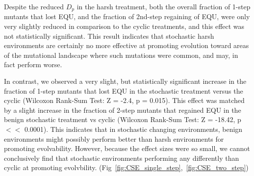\documentclass[PhD]{msu-thesis}
\begin{document}
Despite the reduced $D_p$ in the harsh treatment, both the overall fraction of 1-step mutants that lost EQU, and the fraction of 2nd-step regaining of EQU, were only very slightly reduced in comparison to the cyclic treatments, and this effect was not statistically significant. This result indicates that stochastic harsh environments are certainly no more effective at promoting evolution toward areas of the mutational landscape where such mutations were common, and may, in fact perform worse. 

In contrast, we observed a very slight, but statistically significant increase in the fraction of 1-step mutants that lost EQU in the stochastic treatment versus the cyclic (Wilcoxon Rank-Sum Test: Z = -2.4, p = 0.015). This effect was matched by a slight increase in the fraction of 2-step mutants that regained EQU in the benign stochastic treatment vs cyclic (Wilcoxon Rank-Sum Test: Z = -18.42, p $<<$ 0.0001). This indicates that in stochastic changing environments, benign environments might possibly perform better than harsh environments for promoting evolvability. However, because the effect sizes were so small, we cannot conclusively find that stochastic environments performing any differently than cyclic at promoting evolvbility.
(Fig~\ref{fig:CSE_single_step},~\ref{fig:CSE_two_step})
\end{document}
